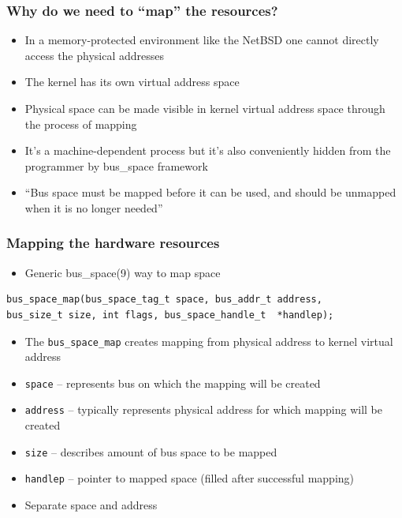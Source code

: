 \documentclass[dvipsnames,table]{beamer}
\begin{document}
\begin{frame}
\frametitle{Why do we need to ``map'' the resources?}
\begin{itemize}
	\item In a memory-protected environment like the NetBSD one cannot directly access the physical addresses
	\item The kernel has its own virtual address space
    \item Physical space can be made visible in kernel virtual address space through the process of mapping
    \item It's a machine-dependent process but it's also conveniently hidden from the programmer by bus\_space framework
    \item ``Bus space must be mapped before it can be used, and should be unmapped
     when it is no longer needed''
\end{itemize}
\end{frame}


\begin{frame}[fragile]
\frametitle{Mapping the hardware resources}

\begin{itemize}
	\item Generic bus\_space(9) way to map space
\end{itemize}

\begin{verbatim}
bus_space_map(bus_space_tag_t space, bus_addr_t address, 
bus_size_t size, int flags, bus_space_handle_t  *handlep);
\end{verbatim}

\begin{itemize}
	\item The {\tt bus\_space\_map} creates mapping from physical address to kernel virtual address
    \item {\tt space} -- represents bus on which the mapping will be created
    \item {\tt address} -- typically represents physical address for which mapping will be created
	\item {\tt size} -- describes amount of bus space to be mapped
	\item {\tt handlep} -- pointer to mapped space (filled after successful mapping)
    \item Separate space and address
\end{itemize}
\end{frame}
\end{document}
